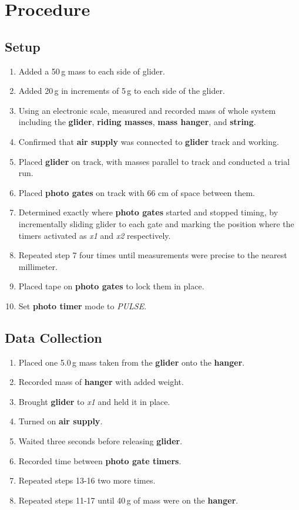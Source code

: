 
\section{Procedure}
\vspace{-0.5cm}
\singlespacing



\subsection{Setup}

	\begin{enumerate}
		\item Added a 50\,g mass to each side of glider.
		\item Added 20\,g in increments of 5\,g to each side of the glider.
		\item Using an electronic scale, measured and recorded mass of whole system including the \textbf{glider}, \textbf{riding masses}, \textbf{mass hanger}, and \textbf{string}.
		\item Confirmed that \textbf{air supply} was connected to \textbf{glider} track and working.
		\item Placed \textbf{glider} on track, with masses parallel to track and conducted a trial run.
		\item Placed \textbf{photo gates} on track with 66 cm of space between them.
		\item Determined exactly where \textbf{photo gates} started and stopped timing, by incrementally sliding glider to each gate and marking the position where the timers activated as \textit{x1} and \textit{x2} respectively.
		\item Repeated step 7 four times until measurements were precise to the nearest millimeter.
		\item Placed tape on \textbf{photo gates} to lock them in place.
		\item Set \textbf{photo timer} mode to \textit{PULSE}. 
	\end{enumerate}	

\subsection{Data Collection}

	\begin{enumerate}[resume]
		\item Placed one 5.0\,g mass taken from the \textbf{glider} onto the \textbf{hanger}.
		\item Recorded mass of \textbf{hanger} with added weight. 
		\item Brought \textbf{glider} to \textit{x1} and held it in place.
		\item Turned on \textbf{air supply}.
		\item Waited three seconds before releasing \textbf{glider}. 
		\item Recorded time between \textbf{photo gate timers}.
		\item Repeated steps 13-16 two more times.
		\item Repeated steps 11-17 until 40\,g of mass were on the \textbf{hanger}.
	\end{enumerate}

\newpage




